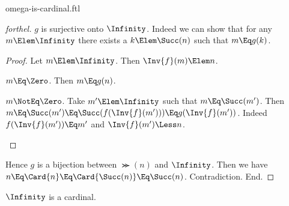 \documentclass{stex}
\begin{document}
\begin{smodule}{omega-is-cardinal.ftl}
\begin{proof}[forthel]
    $g$ is surjective onto $\Infinity$.
    Indeed we can show that for any $m \Elem \Infinity$ there exists a $k \Elem \Succ(n)$ such that $m \Eq g(k)$.
    \begin{proof}
      Let $m \Elem \Infinity$.
      Then $\Inv{f}(m) \Elem n$.

      \begin{case}{$m \Eq \Zero$.}
        Then $m \Eq g(n)$.
      \end{case}

      \begin{case}{$m \NotEq \Zero$.}
        Take $m' \Elem \Infinity$ such that $m \Eq \Succ(m')$.
        Then $m
          \Eq \Succ(m')
          \Eq \Succ(f(\Inv{f}(m')))
          \Eq g(\Inv{f}(m'))$.
        Indeed $f(\Inv{f}(m')) \Eq m'$ and $\Inv{f}(m') \Less n$.
      \end{case}
    \end{proof}

    Hence $g$ is a bijection between $\Succ(n)$ and $\Infinity$.
    Then we have $n
      \Eq \Card{n}
      \Eq \Card{\Succ(n)}
      \Eq \Succ(n)$.
    Contradiction.
  End.
\end{proof}

\begin{proposition*}[forthel]
  $\Infinity$ is a cardinal.
\end{proposition*}

\end{smodule}
\end{document}
